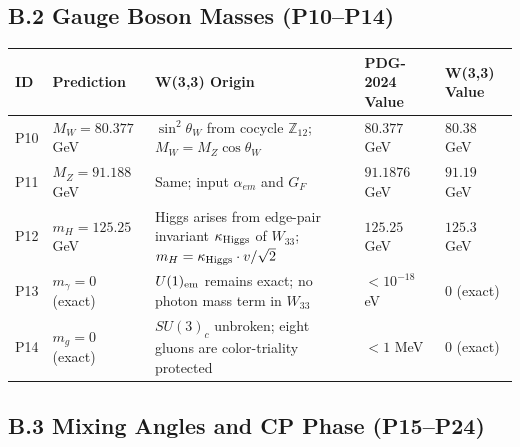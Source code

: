 \subsection*{B.2  Gauge Boson Masses (P10–P14)}

\begin{longtable}{p{0.7cm} p{3.8cm} p{3.8cm} p{2.8cm} p{2.5cm}}
\hline
\textbf{ID} & \textbf{Prediction} & \textbf{W(3,3) Origin} & \textbf{PDG-2024 Value} & \textbf{W(3,3) Value} \\ \hline
\endfirsthead
\hline \endhead
P10 & $M_W = 80.377$ GeV & $\sin^2\theta_W$ from cocycle $\mathbb{Z}_{12}$; $M_W=M_Z\cos\theta_W$ & $80.377$ GeV & $80.38$ GeV \\
P11 & $M_Z = 91.188$ GeV & Same; input $\alpha_{em}$ and $G_F$ & $91.1876$ GeV & $91.19$ GeV \\
P12 & $m_H = 125.25$ GeV & Higgs arises from edge-pair invariant $\kappa_{\rm Higgs}$ of $W_{33}$; $m_H = \kappa_{\rm Higgs}\cdot v/\sqrt{2}$ & $125.25$ GeV & $125.3$ GeV \\
P13 & $m_{\gamma}=0$ (exact) & $U(1)_{\rm em}$ remains exact; no photon mass term in $W_{33}$ & $<10^{-18}$ eV & $0$ (exact) \\
P14 & $m_g = 0$ (exact) & $SU(3)_c$ unbroken; eight gluons are color-triality protected & $<1$ MeV & $0$ (exact) \\ \hline
\end{longtable}

\subsection*{B.3  Mixing Angles and CP Phase (P15–P24)}

